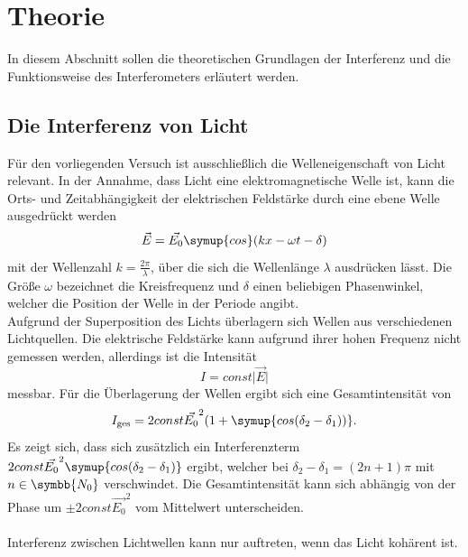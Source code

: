 \section{Theorie}

    In diesem Abschnitt sollen die theoretischen Grundlagen der Interferenz und die Funktionsweise 
    des Interferometers erläutert werden.

\subsection{Die Interferenz von Licht}

    Für den vorliegenden Versuch ist ausschließlich die Welleneigenschaft von Licht relevant.
    In der Annahme, 
    dass Licht eine elektromagnetische Welle ist,
    kann die Orts- und Zeitabhängigkeit der elektrischen Feldstärke durch eine ebene Welle ausgedrückt werden
    \begin{equation}
        \vec{E} = \vec{E_0} \symup{cos}(kx - \omega t - \delta) \label{eqn:EbeneWelle}
    \end{equation}
    mit der Wellenzahl $k = \frac{2 \pi}{\lambda}$,
    über die sich die Wellenlänge $\lambda$ ausdrücken lässt.
    Die Größe $\omega$ bezeichnet die Kreisfrequenz und $\delta$ einen beliebigen Phasenwinkel,
    welcher die Position der Welle in der Periode angibt.\\
    Aufgrund der Superposition des Lichts überlagern sich Wellen aus verschiedenen Lichtquellen.
    Die elektrische Feldstärke kann aufgrund ihrer hohen Frequenz nicht gemessen werden,
    allerdings ist die Intensität 
    \begin{equation}
        I = const \lvert \vec{E} \rvert
    \end{equation} 
    messbar.
    Für die Überlagerung der Wellen ergibt sich eine Gesamtintensität von
    \begin{equation}
        I_\text{ges} = 2 const \vec{E_0}^2 (1 + \symup{cos(\delta_2 - \delta_1))}.
    \end{equation}
    Es zeigt sich, 
    dass sich zusätzlich ein Interferenzterm $ 2 const \vec{E_0}^2 \symup{cos(\delta_2 - \delta_1)} $ ergibt,
    welcher bei $\delta_2 - \delta_1 = (2n + 1) \pi$ mit $n \in \symbb{N_0}$ verschwindet.
    Die Gesamtintensität kann sich abhängig von der Phase um $\pm 2 const \vec{E_0}^2 $ vom Mittelwert unterscheiden. \\
    \\
    Interferenz zwischen Lichtwellen kann nur auftreten, 
    wenn das Licht kohärent ist.

